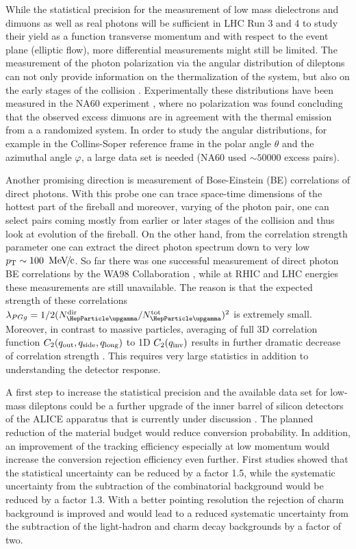 \documentclass[../report.tex]{subfiles}
\begin{document}
While the statistical precision for the measurement of low mass dielectrons and dimuons as well as real photons will be sufficient in LHC Run 3 and 4 to study their yield as a function transverse momentum and with respect to the event plane (elliptic flow), more differential measurements might still be limited. 
The measurement of the photon polarization via the angular distribution of dileptons can not only provide information on the thermalization of the system, but also on the early stages of the collision \cite{Baym:2017qxy}. Experimentally these distributions have been measured in the NA60 experiment \cite{Arnaldi:2008gp}, where no polarization was found concluding that the observed excess dimuons are in agreement with the thermal emission from a a randomized system. In order to study the angular distributions, for example in the Collins-Soper reference frame \cite{Collins:1977iv,Lam:1978pu,Lam:1980uc} in the polar angle $\theta$ and the azimuthal angle $\varphi$, a large data set is needed (NA60 used $\sim50000$ excess \PGmpGmm pairs).

Another promising direction is measurement of Bose-Einstein (BE) correlations of direct photons. With this probe one can trace space-time dimensions of the hottest part of the fireball and moreover, varying \kT{} of the photon pair, one can select pairs coming mostly from earlier or later stages of the collision and thus look at evolution of the fireball. On the other hand, from the correlation strength parameter one can extract the direct photon spectrum down to very low $\pT \sim \unit[100]{\UMeVc}$. So far there was one successful measurement of direct photon BE correlations by the WA98 Collaboration \cite{Aggarwal:2003zy}, while at RHIC and LHC energies these measurements are still unavailable. The reason is that the expected strength of these correlations $\lambda_{PGg}= 1/2(N_{\PGg}^{\rm dir}/N_{\PGg}^{\rm tot})^2$ is extremely small. Moreover, in contrast to massive particles, averaging of full 3D correlation function $C_2(q_{\rm out},q_{\rm side},q_{\rm long})$ to 1D $C_2(q_{\rm inv})$ results in further dramatic decrease of correlation strength \cite{Aggarwal:2003zy}. This requires very large statistics in addition to understanding the detector response. 

A first step to increase the statistical precision and the available data set for low-mass dileptons could be a further upgrade of the inner barrel of silicon detectors of the ALICE apparatus that is currently under discussion \cite{ALICE:ITS3LoI}. The planned reduction of the material budget would reduce conversion probability. In addition, an improvement of the tracking efficiency especially at low momentum would increase the conversion rejection efficiency even further. First studies \cite{ALICE:ITS3LoI} showed that the statistical uncertainty can be reduced by a factor 1.5, while the systematic uncertainty from the subtraction of the combinatorial background would be reduced by a factor 1.3. With a better pointing resolution the rejection of charm background is improved and would lead to a reduced systematic uncertainty from the subtraction of the light-hadron and charm decay backgrounds by a factor of two. 
\end{document}
